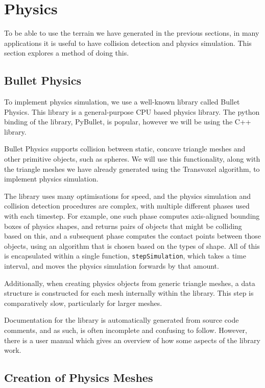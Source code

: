 \documentclass{article}
\begin{document}
\section{Physics}
To be able to use the terrain we have generated in the previous sections, in many applications it is useful to have collision detection and physics simulation. This section explores a method of doing this.
\subsection{Bullet Physics}
To implement physics simulation, we use a well-known library called Bullet Physics\cite{bullet-physics}. This library is a general-purpose CPU based physics library. The python binding of the library, PyBullet, is popular, however we will be using the C++ library.

Bullet Physics supports collision between static, concave triangle meshes and other primitive objects, such as spheres. We will use this functionality, along with the triangle meshes we have already generated using the Transvoxel algorithm, to implement physics simulation.

The library uses many optimisations for speed, and the physics simulation and collision detection procedures are complex, with multiple different phases used with each timestep. For example, one such phase computes axis-aligned bounding boxes of physics shapes, and returns pairs of objects that might be colliding based on this, and a subsequent phase computes the contact points between those objects, using an algorithm that is chosen based on the types of shape. All of this is encapsulated within a single function, \texttt{stepSimulation}, which takes a time interval, and moves the physics simulation forwards by that amount.

Additionally, when creating physics objects from generic triangle meshes, a data structure is constructed for each mesh internally within the library. This step is comparatively slow, particularly for larger meshes.

Documentation for the library is automatically generated from source code comments, and as such, is often incomplete and confusing to follow. However, there is a user manual which gives an overview of how some aspects of the library work\cite{coumans_2015}.

\subsection{Creation of Physics Meshes}
\end{document}
